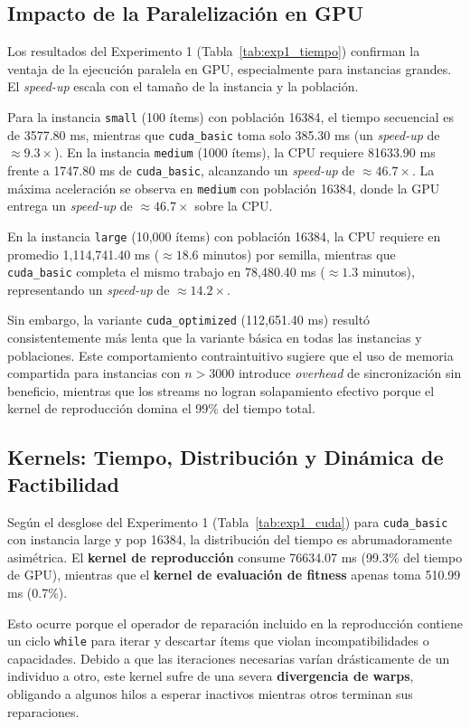 \subsection{Impacto de la Paralelización en GPU}

Los resultados del Experimento 1 (Tabla~\ref{tab:exp1_tiempo}) confirman la ventaja de la ejecución paralela en GPU, especialmente para instancias grandes. El \emph{speed-up} escala con el tamaño de la instancia y la población.

Para la instancia \texttt{small} (100 ítems) con población 16384, el tiempo secuencial es de 3577.80 ms, mientras que \texttt{cuda\_basic} toma solo 385.30 ms (un \emph{speed-up} de $\approx 9.3\times$). En la instancia \texttt{medium} (1000 ítems), la CPU requiere 81633.90 ms frente a 1747.80 ms de \texttt{cuda\_basic}, alcanzando un \emph{speed-up} de $\approx 46.7\times$. La máxima aceleración se observa en \texttt{medium} con población 16384, donde la GPU entrega un \emph{speed-up} de $\approx 46.7\times$ sobre la CPU.

En la instancia \texttt{large} (10,000 ítems) con población 16384, la CPU requiere en promedio 1,114,741.40 ms ($\approx 18.6$ minutos) por semilla, mientras que \texttt{cuda\_basic} completa el mismo trabajo en 78,480.40 ms ($\approx 1.3$ minutos), representando un \emph{speed-up} de $\approx 14.2\times$.

Sin embargo, la variante \texttt{cuda\_optimized} (112,651.40 ms) resultó consistentemente más lenta que la variante básica en todas las instancias y poblaciones. Este comportamiento contraintuitivo sugiere que el uso de memoria compartida para instancias con $n > 3000$ introduce \emph{overhead} de sincronización sin beneficio, mientras que los streams no logran solapamiento efectivo porque el kernel de reproducción domina el 99\% del tiempo total.

\subsection{Kernels: Tiempo, Distribución y Dinámica de Factibilidad}

Según el desglose del Experimento 1 (Tabla~\ref{tab:exp1_cuda}) para \texttt{cuda\_basic} con instancia large y pop 16384, la distribución del tiempo es abrumadoramente asimétrica. El \textbf{kernel de reproducción} consume 76634.07 ms (99.3\% del tiempo de GPU), mientras que el \textbf{kernel de evaluación de fitness} apenas toma 510.99 ms (0.7\%).

Esto ocurre porque el operador de reparación incluido en la reproducción contiene un ciclo \texttt{while} para iterar y descartar ítems que violan incompatibilidades o capacidades. Debido a que las iteraciones necesarias varían drásticamente de un individuo a otro, este kernel sufre de una severa \textbf{divergencia de warps}, obligando a algunos hilos a esperar inactivos mientras otros terminan sus reparaciones.

